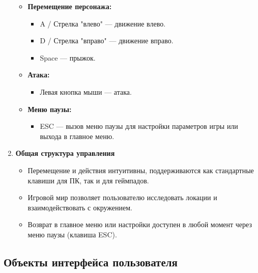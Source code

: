 \documentclass{article}
\begin{document}
\begin{enumerate}
	\begin{itemize}
		\item \textbf{Перемещение персонажа:}
		\begin{itemize}
			\item A / Стрелка "влево" — движение влево.
			\item D / Стрелка "вправо" — движение вправо.
			\item Space — прыжок.
		\end{itemize}
		\item \textbf{Атака:}
		\begin{itemize}
			\item Левая кнопка мыши — атака.
		\end{itemize}
		\item \textbf{Меню паузы:}
		\begin{itemize}
			\item ESC — вызов меню паузы для настройки параметров игры или выхода в главное меню.
		\end{itemize}
	\end{itemize}
	\item \textbf{Общая структура управления}
	\begin{itemize}
		\item Перемещение и действия интуитивны, поддерживаются как стандартные клавиши для ПК, так и для геймпадов.
		\item Игровой мир позволяет пользователю исследовать локации и взаимодействовать с окружением.
		\item Возврат в главное меню или настройки доступен в любой момент через меню паузы (клавиша ESC).
	\end{itemize}
\end{enumerate}


\clearpage %

\subsection{Объекты интерфейса пользователя}
\end{document}
